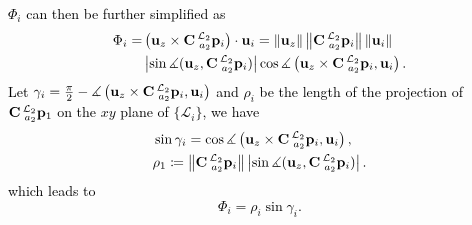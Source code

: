 \documentclass[journal]{IEEEtran}
\newcommand{\norm}[1]{\left\lVert#1\right\rVert}
\def\AlignedPosTarg{\mathbf{C} \prescript{\mathcal{L}_2}{a_2}{\mathbf{p}}} %
\def\UnitZ{\mathbf{u}_z}
\begin{document}
\begin{appendices}
\textcolor{black}{
$\Phi_i$ can then be further simplified as
\begin{equation}
\begin{aligned}
    \Phi_i =
    &\left( \UnitZ \times \AlignedPosTarg_i \right)
    \cdot \mathbf{u}_i
    =
    \norm{\UnitZ} 
    \norm{\AlignedPosTarg_i} 
    \norm{\mathbf{u}_i} \\
    &\left| 
        \sin \measuredangle (\UnitZ, \AlignedPosTarg_i)
    \right|
    \cos \measuredangle 
    \left( \UnitZ \times \AlignedPosTarg_i, \mathbf{u}_i \right).\\
\end{aligned}
\end{equation}
Let
$\gamma_i = \frac{\pi}{2} - \measuredangle \left(\UnitZ \times \AlignedPosTarg_i, \mathbf{u}_i\right)$ 
and $\rho_i$ be the length of the projection of $\AlignedPosTarg_1$ on the $xy$ plane of $\{\mathcal{L}_i\}$, we have
\begin{equation*}
\begin{aligned}
    &\sin \gamma_i = \cos \measuredangle 
        \left( \UnitZ \times \AlignedPosTarg_i, \mathbf{u}_i \right),\\
    &\rho_1 \coloneqq
    \norm{\AlignedPosTarg_i}
    \left| 
        \sin \measuredangle (\UnitZ, \AlignedPosTarg_i)
    \right|. \\
\end{aligned}
\end{equation*}
which leads to
\begin{equation} \label{eq:det_Lambda_Phii}
    \Phi_i = \rho_i \sin \gamma_i.
\end{equation}
}

\section{}\label{appendix:sub_problems_derivation}


\end{appendices}
\end{document}
